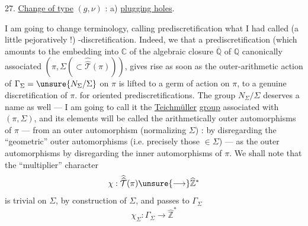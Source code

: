 
27. \uline{Change of type} $(g,\nu)$ : a) \uline{plugging holes}.

I am going to change terminology, calling
prediscretification what I had called (a little
pejoratively !) -discretification. Indeed, we
 that a prediscretification  (which amounts 
to the embedding  into $\mathbb C$ of the algebraic closure $\overline{\mathbb Q}$ of $\mathbb Q$
canonically associated  $(\pi,\Sigma(\subset\widehat{\widehat{\mathcal T}}(\pi)))$, gives
rise as soon as the outer-arithmetic action of
$\Gamma_\Sigma=\unsure{N_\Sigma/\Sigma}$ on $\pi$ is lifted to a germ of action
on $\pi$, to a genuine discretification of $\pi$.  for
oriented prediscretifications. The group $N_\Sigma/\Sigma$ deserves
a name as well --- I am going to call it the 
\uline{Teichmüller} \uline{group} associated with $(\pi,\Sigma)$, and
its elements will be called the
arithmetically outer automorphisms of $\pi$ ---  from an
outer automorphism (normalizing $\Sigma$) : by disregarding the
``geometric'' outer automorphisms (i.e. precisely those
$\in\Sigma$) ---  as the  outer automorphisms 
 by disregarding the inner automorphisms of $\pi$.
We  shall note that the ``multiplier'' character
\[
\chi:\widehat{\widehat{\mathcal T}}(\pi)\unsure{\longrightarrow}\widehat{\mathbb Z}^{*}
\]
is trivial on $\Sigma$, by construction of $\Sigma$, and
passes to $\Gamma_\Sigma$
\[
\chi_\Sigma:\Gamma_\Sigma\longrightarrow\widehat{\mathbb Z}^{*}
\]
